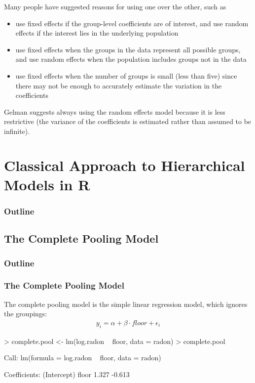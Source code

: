 \documentclass[handout]{beamer}
\begin{document}
\begin{frame}
Many people have suggested reasons for using one over the other, such as
\pause
\begin{itemize}
\item use fixed effects if the group-level coefficients are of
interest, and use random effects if the interest lies in the
underlying population
\pause
\item use fixed effects when the groups in the data represent all
possible groups, and use random effects when the population includes
groups not in the data
\pause
\item use fixed effects when the number of groups is small
(less than five) since there may not be enough to accurately estimate
the variation in the coefficients
\end{itemize}
\bigskip
\pause
Gelman suggests always using the random effects model because it is
less restrictive (the variance of the coefficients is estimated rather
than assumed to be infinite).
\end{frame}

\section{Classical Approach to Hierarchical Models in R}

\begin{frame}
\frametitle{Outline}
\tableofcontents[currentsection]
\end{frame}




\subsection{The Complete Pooling Model}

\begin{frame}
\frametitle{Outline}
\tableofcontents[currentsubsection]
\end{frame}

\begin{frame}[fragile]
\frametitle{The Complete Pooling Model}
\pause
The complete pooling model is the simple linear regression model, which
ignores the groupings:
\pause
\begin{eqnarray*}
y_i = \alpha + \beta \cdot floor + \epsilon_i
\end{eqnarray*}
\tiny
\pause
\begin{Schunk}
\begin{Sinput}
> complete.pool <- lm(log.radon ~ floor, data = radon)
> complete.pool
\end{Sinput}
\begin{Soutput}
Call:
lm(formula = log.radon ~ floor, data = radon)

Coefficients:
(Intercept)        floor  
      1.327       -0.613  
\end{Soutput}
\end{Schunk}
\normalsize
\end{frame}
\end{document}
